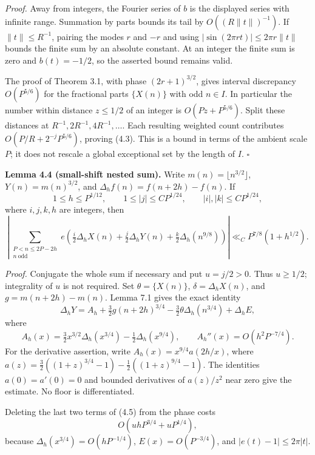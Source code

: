 \documentclass[11pt,a4paper]{article}
\begin{document}
\emph{Proof.} Away from integers, the Fourier series of \(b\) is the
displayed series with infinite range. Summation by parts bounds its tail
by \(O((R\|t\|)^{-1})\). If \(\|t\|\le R^{-1}\), pairing the modes \(r\)
and \(-r\) and using \(|\sin(2\pi rt)|\le2\pi r\|t\|\) bounds the finite
sum by an absolute constant. At an integer the finite sum is zero and
\(b(t)=-1/2\), so the asserted bound remains valid.

The proof of Theorem 3.1, with phase \((2r+1)^{3/2}\), gives interval
discrepancy \(O(P^{5/6})\) for the fractional parts \(\{X(n)\}\) with
odd \(n\in I\). In particular the number within distance \(z\le1/2\) of
an integer is \(O(Pz+P^{5/6})\). Split these distances at
\(R^{-1},2R^{-1},4R^{-1},\ldots\). Each resulting weighted count
contributes \(O(P/R+2^{-j}P^{5/6})\), proving (4.3). This is a bound in
terms of the ambient scale \(P\); it does not rescale a global
exceptional set by the length of \(I\). \(\square\)


\textbf{Lemma 4.4 (small-shift nested sum).} Write
\(m(n)=\lfloor n^{3/2}\rfloor\), \(Y(n)=m(n)^{3/2}\), and
\(\Delta_h f(n)=f(n+2h)-f(n)\). If \[
1\le h\le P^{1/12},\qquad
1\le |j|\le CP^{1/24},\qquad |i|,|k|\le CP^{1/24},
\] where \(i,j,k,h\) are integers, then \[
\left|\sum_{\substack{P<n\le2P-2h\\n\ \mathrm{odd}}}
e\left(\tfrac i2\Delta_hX(n)+\tfrac j2\Delta_hY(n)
+\tfrac k2\Delta_h(n^{9/8})\right)\right|
\ll_C P^{7/8}(1+h^{1/2}).
\tag{4.4}
\]

\emph{Proof.} Conjugate the whole sum if necessary and put \(u=j/2>0\).
Thus \(u\ge1/2\); integrality of \(u\) is not required. Set
\(\theta=\{X(n)\}\), \(\delta=\Delta_hX(n)\), and \(g=m(n+2h)-m(n)\).
Lemma 7.1 gives the exact identity \[
\Delta_hY=A_h+\tfrac32g(n+2h)^{3/4}
-\tfrac32\theta\Delta_h(n^{3/4})+\Delta_h E,
\tag{4.5}
\] where \[
A_h(x)=\tfrac32x^{3/2}\Delta_h(x^{3/4})
-\tfrac12\Delta_h(x^{9/4}),\qquad
A_h''(x)=O(h^2P^{-7/4}).
\] For the derivative assertion, write \(A_h(x)=x^{9/4}a(2h/x)\), where
\(a(z)=\tfrac32((1+z)^{3/4}-1)-\tfrac12((1+z)^{9/4}-1)\). The identities
\(a(0)=a'(0)=0\) and bounded derivatives of \(a(z)/z^2\) near zero give
the estimate. No floor is differentiated.

Deleting the last two terms of (4.5) from the phase costs \[
O(uhP^{3/4}+uP^{1/4}),
\tag{4.6}
\] because \(\Delta_h(x^{3/4})=O(hP^{-1/4})\), \(E(x)=O(P^{-3/4})\), and
\(|e(t)-1|\le2\pi|t|\).
\end{document}
